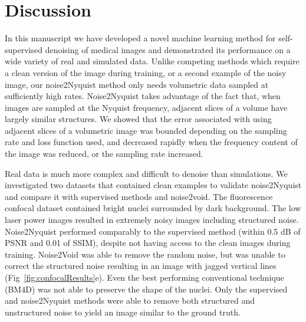 \documentclass[journal,twoside,web]{ieeecolor}
\begin{document}
\section{Discussion}
In this manuscript we have developed a novel machine learning method for self-supervised denoising of medical images and demonstrated its performance on a wide variety of real and simulated data. Unlike competing methods which require a clean version of the image during training, or a second example of the noisy image, our noise2Nyquist method only needs volumetric data sampled at sufficiently high rates. Noise2Nyquist takes advantage of the fact that, when images are sampled at the Nyquist frequency, adjacent slices of a volume have largely similar structures. We showed that the error associated with using adjacent slices of a volumetric image was bounded depending on the sampling rate and loss function used, and decreased rapidly when the frequency content of the image was reduced, or the sampling rate increased. %

Real data is much more complex and difficult to denoise than simulations. We investigated two datasets that contained clean examples to validate noise2Nyquist and compare it with supervised methods and noise2void. The fluorescence confocal dataset contained bright nuclei surrounded by dark background. The low laser power images resulted in extremely noisy images including structured noise. Noise2Nyquist performed comparably to the supervised method (within 0.5 dB of PSNR and 0.01 of SSIM), despite not having access to the clean images during training. Noise2Void was able to remove the random noise, but was unable to correct the structured noise\cite{Krull2019} resulting in an image with jagged vertical lines (Fig~\ref{fig:confocalResults}e). Even the best performing conventional technique (BM4D) was not able to preserve the shape of the nuclei. Only the supervised and noise2Nyquist methods were able to remove both structured and unstructured noise to yield an image similar to the ground truth.
\end{document}
